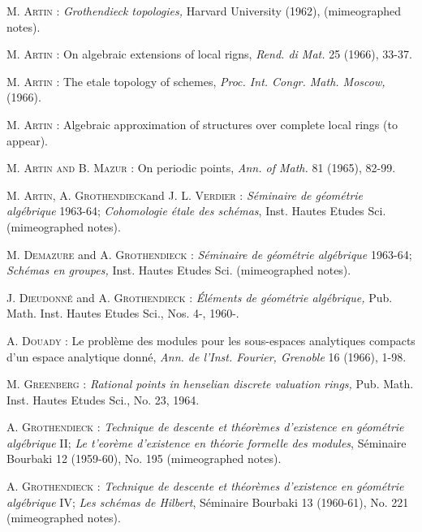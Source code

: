 \begin{thebibliography}{99}
 \textsc{M. Artin :} {\em Grothendieck topologies,} Harvard University (1962), (mimeographed notes).

 \textsc{M. Artin :} On algebraic extensions of local rigns, {\em Rend. di Mat.} 25 (1966), 33-37.

 \textsc{M. Artin :} The etale topology of schemes, {\em Proc. Int. Congr. Math. Moscow,} (1966).

 \textsc{M. Artin :} Algebraic approximation of structures over complete local rings (to appear).

 \textsc{M. Artin and B. Mazur :} On periodic points, {\em Ann. of Math.} 81 (1965), 82-99.

 \textsc{M. Artin, A. Grothendieck}\pageoriginale and \textsc{J. L. Verdier :} {\em S\'eminaire de g\'eom\'etrie alg\'ebrique} 1963-64; {\em Cohomologie \'etale des sch\'emas}, Inst. Hautes Etudes Sci. (mimeographed notes).

 \textsc{M. Demazure} and \textsc{A. Grothendieck :} {\em S\'eminaire de g\'eom\'etrie alg\'ebrique} 1963-64; {\em Sch\'emas en groupes,} Inst. Hautes Etudes Sci. (mimeographed notes).

 \textsc{J. Dieudonn\'e} and \textsc{A. Grothendieck :} {\em \'El\'ements de g\'eom\'etrie alg\'ebrique,} Pub. Math. Inst. Hautes Etudes Sci., Nos. 4-, 1960-.

 \textsc{A. Douady :} Le probl\`eme des modules pour les sous-espaces analytiques compacts d'un espace analytique donn\'e, {\em Ann. de l'Inst. Fourier, Grenoble} 16 (1966), 1-98.

 \textsc{M. Greenberg :} {\em Rational points in henselian discrete valuation rings,} Pub. Math. Inst. Hautes Etudes Sci., No. 23, 1964.

 \textsc{A. Grothendieck :} {\em Technique de descente et th\'eor\`emes d'existence en g\'eom\'etrie alg\'ebrique} II; {\em Le t'eor\`eme d'existence en th\'eorie formelle des modules}, S\'eminaire Bourbaki 12 (1959-60), No. 195 (mimeographed notes). 

 \textsc{A. Grothendieck :} {\em Technique de descente et th\'eor\`emes d'existence en g\'eom\'etrie alg\'ebrique} IV; {\em Les sch\'emas de Hilbert}, S\'eminaire Bourbaki 13 (1960-61), No. 221 (mimeographed notes).


\end{thebibliography}
